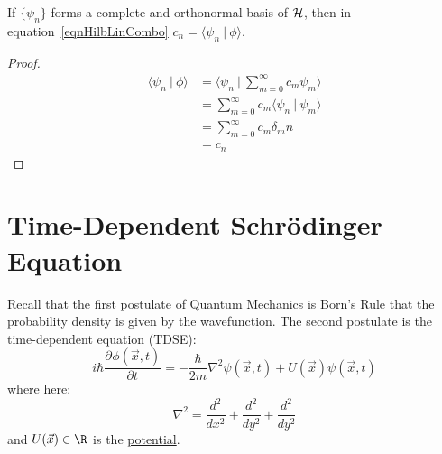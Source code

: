 \documentclass[../Main.tex]{subfiles}
\begin{document}
\begin{lemma}
    If $\{\psi_n\}$ forms a complete and orthonormal basis of $\mathcal{H}$, then  in equation~\ref{eqnHilbLinCombo} $c_n = \langle \psi_n~|~\phi\rangle$.
    \label{lemLinComboCoeffts}
\end{lemma}
\begin{proof}
    \begin{align*}
        \langle \psi_n~|~\phi\rangle &= \langle \psi_n~|~\sum_{m = 0}^\infty c_m \psi_m\rangle \\
        &= \sum_{m = 0}^{\infty}c_m \langle \psi_n~|~\psi_m\rangle \\
        &= \sum_{m = 0}^{\infty} c_m \delta_mn \\
        &= c_n
    \end{align*}
\end{proof}
\section{Time-Dependent Schr\texorpdfstring{\"o}{o}dinger Equation}
Recall that the first postulate of Quantum Mechanics is Born's Rule that the probability density is given by the wavefunction. The second postulate is the time-dependent \schr equation (TDSE):
\begin{equation}
    i\hbar \frac{\partial^{}\phi(\vec{x}, t)}{\partial t^{}} = -\frac{\hbar}{2m}\nabla^2 \psi(\vec{x}, t) + U(\vec{x})\psi(\vec{x}, t)
    \label{eqnTDSE}
\end{equation}
where here:
\begin{equation*}
    \nabla^2 = \frac{d^2}{dx^2} + \frac{d^2}{dy^2} + \frac{d^2}{dy^2}
\end{equation*}
and $U(\vec{x}) \in \R$ is the \underline{potential}.
\end{document}
